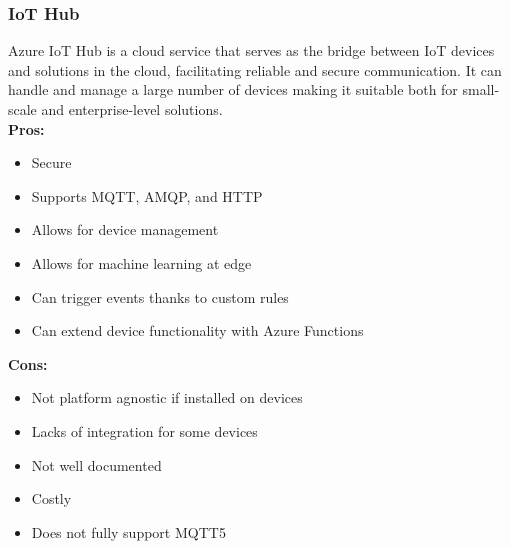         \subsubsection{IoT Hub}
        \label{azure:iot-hub}
        Azure IoT Hub is a cloud service that serves as the bridge between IoT devices and solutions in the cloud, facilitating reliable and secure communication.
        It can handle and manage a large number of devices making it suitable both for small-scale and enterprise-level solutions.\\
        \textbf{Pros:}
        \begin{itemize}
            \item Secure
            \item Supports MQTT, AMQP, and HTTP
            \item Allows for device management
            \item Allows for machine learning at edge
            \item Can trigger events thanks to custom rules
            \item Can extend device functionality with Azure Functions
        \end{itemize}
        \textbf{Cons:}
        \begin{itemize}
            \item Not platform agnostic if installed on devices
            \item Lacks of integration for some devices
            \item Not well documented
            \item Costly
            \item Does not fully support MQTT5
        \end{itemize}


